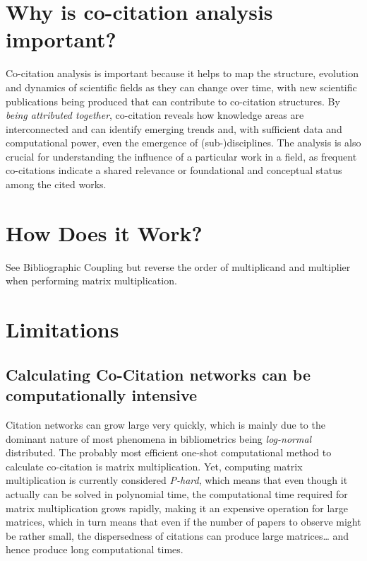 \documentclass[
  letterpaper,
]{scrreprt}
\begin{document}
\section{Why is co-citation analysis
important?}\label{why-is-co-citation-analysis-important}

Co-citation analysis is important because it helps to map the structure,
evolution and dynamics of scientific fields as they can change over
time, with new scientific publications being produced that can
contribute to co-citation structures. By \emph{being attributed
together}, co-citation reveals how knowledge areas are interconnected
and can identify emerging trends and, with sufficient data and
computational power, even the emergence of (sub-)disciplines. The
analysis is also crucial for understanding the influence of a particular
work in a field, as frequent co-citations indicate a shared relevance or
foundational and conceptual status among the cited works.

\section{How Does it Work?}\label{how-does-it-work-11}

See Bibliographic Coupling but reverse the order of multiplicand and
multiplier when performing matrix multiplication.

\section{Limitations}\label{limitations-14}

\subsection{Calculating Co-Citation networks can be computationally
intensive}\label{calculating-co-citation-networks-can-be-computationally-intensive}

Citation networks can grow large very quickly, which is mainly due to
the dominant nature of most phenomena in bibliometrics being
\emph{log-normal} distributed. The probably most efficient one-shot
computational method to calculate co-citation is matrix multiplication.
Yet, computing matrix multiplication is currently considered
\emph{P-hard}, which means that even though it actually can be solved in
polynomial time, the computational time required for matrix
multiplication grows rapidly, making it an expensive operation for large
matrices, which in turn means that even if the number of papers to
observe might be rather small, the dispersedness of citations can
produce large matrices\ldots{} and hence produce long computational
times.
\end{document}

